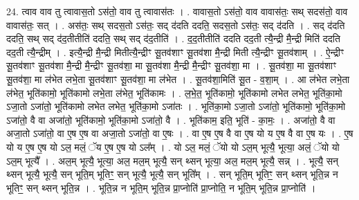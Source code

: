 \documentclass[17pt]{extarticle}
\begin{document}
24. त्वाव वाव तु त्वावास॒तो ऽस॑तो॒ वाव तु त्वावास॑तः । . वावास॒तो ऽस॑तो॒ वाव वावास॑तः॒ सथ् सदस॑तो॒ वाव वावास॑तः॒ सत् । . अस॑तः॒ सथ् सदस॒तो ऽस॑तः॒ सद् द॑दति ददति॒ सदस॒तो ऽस॑तः॒ सद् द॑दति । . सद् द॑दति ददति॒ सथ् सद् द॑द॒तीतीति॑ ददति॒ सथ् सद् द॑द॒तीति॑ । . द॒द॒तीतीति॑ ददति दद॒ती त्यै॒न्द्री मै॒न्द्री मिति॑ ददति दद॒ती त्यै॒न्द्रीम् । . इत्यै॒न्द्री मै॒न्द्री मितीत्यै॒न्द्रीꣳ सू॒तव॑शाꣳ सू॒तव॑शा मै॒न्द्री मिती त्यै॒न्द्रीꣳ सू॒तव॑शाम् । . ऐ॒न्द्रीꣳ सू॒तव॑शाꣳ सू॒तव॑शा मै॒न्द्री मै॒न्द्रीꣳ सू॒तव॑शा॒ मा सू॒तव॑शा मै॒न्द्री मै॒न्द्रीꣳ सू॒तव॑शा॒ मा । . सू॒तव॑शा॒ मा सू॒तव॑शाꣳ सू॒तव॑शा॒ मा ल॑भेत लभे॒ता सू॒तव॑शाꣳ सू॒तव॑शा॒ मा ल॑भेत । . सू॒तव॑शा॒मिति॑ सू॒त - व॒शा॒म् । . आ ल॑भेत लभे॒ता ल॑भेत॒ भूति॑कामो॒ भूति॑कामो लभे॒ता ल॑भेत॒ भूति॑कामः । . ल॒भे॒त॒ भूति॑कामो॒ भूति॑कामो लभेत लभेत॒ भूति॑का॒मो ऽजा॒तो ऽजा॑तो॒ भूति॑कामो लभेत लभेत॒ भूति॑का॒मो ऽजा॑तः । . भूति॑का॒मो ऽजा॒तो ऽजा॑तो॒ भूति॑कामो॒ भूति॑का॒मो ऽजा॑तो॒ वै वा अजा॑तो॒ भूति॑कामो॒ भूति॑का॒मो ऽजा॑तो॒ वै । . भूति॑काम॒ इति॒ भूति॑ - का॒मः॒ । . अजा॑तो॒ वै वा अजा॒तो ऽजा॑तो॒ वा ए॒ष ए॒ष वा अजा॒तो ऽजा॑तो॒ वा ए॒षः । . वा ए॒ष ए॒ष वै वा ए॒ष यो य ए॒ष वै वा ए॒ष यः । . ए॒ष यो य ए॒ष ए॒ष यो ऽल॒ मलं॒ ॅय ए॒ष ए॒ष यो ऽल᳚म् । . यो ऽल॒ मलं॒ ॅयो यो ऽल॒म् भूत्यै॒ भूत्या॒ अलं॒ ॅयो यो ऽल॒म् भूत्यै᳚ । . अल॒म् भूत्यै॒ भूत्या॒ अल॒ मल॒म् भूत्यै॒ सन् थ्सन् भूत्या॒ अल॒ मल॒म् भूत्यै॒ सन्न् । . भूत्यै॒ सन् थ्सन् भूत्यै॒ भूत्यै॒ सन् भूति॒म् भूतिꣳ॒॒ सन् भूत्यै॒ भूत्यै॒ सन् भूति᳚म् । . सन् भूति॒म् भूतिꣳ॒॒ सन् थ्सन् भूति॒न्न न भूतिꣳ॒॒ सन् थ्सन् भूति॒न्न । . भूति॒न्न न भूति॒म् भूति॒न्न प्रा॒प्नोति॑ प्रा॒प्नोति॒ न भूति॒म् भूति॒न्न प्रा॒प्नोति॑ । \newline
\end{document}
